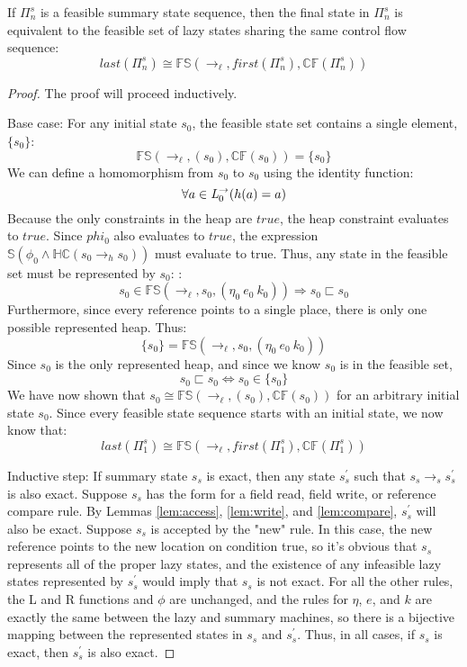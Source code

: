 \begin{theorem}
If $\Pi_n^s$ is a feasible summary state sequence, then the final state in $\Pi_n^s$ is equivalent to the feasible set of lazy states sharing the same control flow sequence:
\begin{equation}
\mathit{last}(\Pi_n^s) \cong \mathbb{FS}(\rightarrow_\ell, \mathit{first}(\Pi_n^s), \mathbb{CF}(\Pi_n^s) )
\end{equation}
\end{theorem}
\begin{proof}
The proof will proceed inductively.

Base case: For any initial state $s_0$, the feasible state set contains a single element, $\{s_0\}$:
$$\mathbb{FS}(\rightarrow_\ell, (s_0), \mathbb{CF}(s_0)) = \{s_0\}$$
We can define a homomorphism from $s_0$ to $s_0$ using the identity function: 
$$\forall a \in \emph{L}_0^\rightarrow ( h(a) = a )$$ 
Because the only constraints in the heap are $\mathit{true}$, the heap constraint evaluates to $\mathit{true}$. Since $phi_0$ also evaluates to $\mathit{true}$, the expression $\mathbb{S}(\phi_0 \wedge \mathbb{HC}(s_0 \rightarrow_h s_0 ) ) $ must evaluate to true. Thus, any state in the feasible set must be represented by $s_0$: :
$$s_0 \in \mathbb{FS}(\rightarrow_\ell,s_0, (\eta_0\ e_0\ k_0) ) \Rightarrow s_0 \sqsubset s_0$$
Furthermore, since every reference points to a single place, there is only one possible represented heap. Thus:
$$ \{s_0\} = \mathbb{FS}(\rightarrow_\ell,s_0, (\eta_0\ e_0\ k_0) )$$
Since $s_0$ is the only represented heap, and since we know $s_0$ is in the feasible set, 
$$s_0 \sqsubset s_0 \Leftrightarrow s_0 \in \{s_0\}$$
We have now shown that $s_0 \cong \mathbb{FS}(\rightarrow_\ell, (s_0), \mathbb{CF}(s_0))$ for an arbitrary initial state $s_0$. Since every feasible state sequence starts with an initial state, we now know that:
 $$\mathit{last}(\Pi_1^s) \cong \mathbb{FS}(\rightarrow_\ell, \mathit{first}(\Pi_1^s), \mathbb{CF}(\Pi_1^s) ) $$

Inductive step: If summary state $s_s$ is exact, then any state $s_s^\prime$ such that $s_s \rightarrow_s s_s^\prime$ is also exact. Suppose $s_s$ has the form for a field read, field write, or reference compare rule. By Lemmas \ref{lem:access}, \ref{lem:write}, and \ref{lem:compare}, $s_s^\prime$ will also be exact.
Suppose $s_s$ is accepted by the "new" rule. In this case, the new reference points to the new location on condition true, so it's obvious that $s_s$ represents all of the proper lazy states, and the existence of any infeasible lazy states represented by $s_s^\prime$ would imply that $s_s$ is not exact.
For all the other rules, the L and R functions and $\phi$ are unchanged, and the rules for  $\eta$, $e$, and $k$ are exactly the same between the lazy and summary machines, so there is a bijective mapping between the represented states in $s_s$ and $s_s^\prime$.
Thus, in all cases, if $s_s$ is exact, then $s_s^\prime$ is also exact.


\end{proof}
